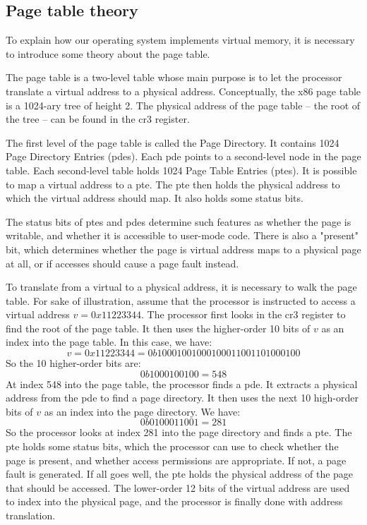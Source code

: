 \documentclass{article}
\begin{document}


\subsection{Page table theory}
To explain how our operating system implements virtual memory, it is necessary
to introduce some theory about the page table.

The page table is a two-level table whose main purpose is to let the processor
translate a virtual address to a physical address.  Conceptually, the x86 page
table is a 1024-ary tree of height 2. The physical address of the page table
-- the root of the tree -- can be found in the \gls{cr3} register.

The first level of the page table is called the Page Directory. It contains
1024 Page Directory Entries (\gls{pde}s). Each \gls{pde} points to a
second-level node in the page table.
Each second-level table holds 1024 Page Table
Entries (\gls{pte}s). It is possible to map a virtual address to a \gls{pte}.
The \gls{pte} then holds the physical address to which the virtual address
should map. It also holds some status bits.

The status bits of \gls{pte}s and \gls{pde}s determine such features as
whether the page is writable, and whether it is accessible to user-mode code.
There is also a "present" bit, which determines whether the page is virtual
address maps to a physical page at all, or if accesses should cause a page
fault instead.

To translate from a virtual to a physical address, it is necessary to walk the
page table. For sake of illustration, assume that the processor is instructed
to access a virtual address $v = 0x11223344$. The processor first looks in the
\gls{cr3} register to find the root of the page table. It then uses the
higher-order 10 bits of $v$ as an index into the page table. In this case, we
have:
$$ v = 0x11223344 = 0b10001001000100011001101000100 $$
So the 10 higher-order bits are:
$$ 0b1000100100 = 548 $$
At index 548 into the page table, the processor finds a \gls{pde}. It extracts
a physical address from the \gls{pde} to find a page directory. It then uses
the next 10 high-order bits of $v$ as an index into the page directory. We
have:
$$ 0b0100011001 = 281 $$
So the processor looks at index 281 into the page directory and finds a
\gls{pte}. The \gls{pte} holds some status bits, which the processor can use
to check whether the page is present, and whether access permissions are
appropriate. If not, a page fault is generated. If all goes well, the
\gls{pte} holds the physical address of the page that should be accessed. The
lower-order 12 bits of the virtual address are used to index into the physical
page, and the processor is finally done with address translation.
\end{document}
